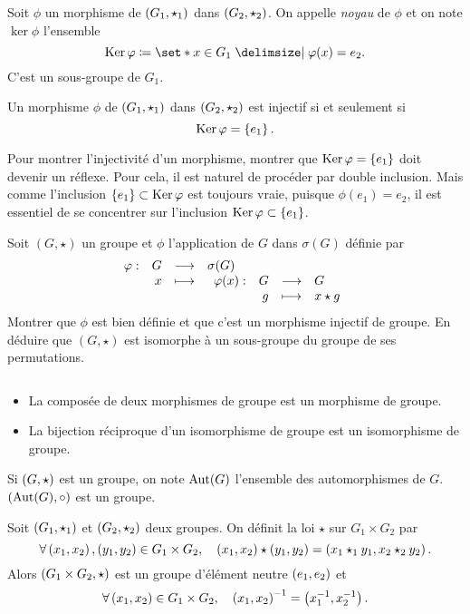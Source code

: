 \documentclass{magnolia}
\begin{document}
\begin{definition}
Soit $\phi$ un morphisme de $\left(G_1,\star_1\right)$ dans $\left(G_2,\star_2\right)$. On
appelle \emph{noyau} de $\phi$ et on note $\ker\phi$ l'ensemble
\[\ker\phi\defeq\enstq{x\in G_1}{\phi(x)=e_2}.\]
C'est un sous-groupe de $G_1$.
\end{definition}

\begin{proposition}
Un morphisme $\phi$ de $\left(G_1,\star_1\right)$ dans $\left(G_2,\star_2\right)$ est injectif
si et seulement si
\[\mathop{\rm Ker}\varphi=\left\{e_1\right\}.\]
\end{proposition}

\begin{remarqueUnique}
\remarque Pour montrer l'injectivité d'un morphisme, montrer que $\mathop{\rm Ker}\varphi=\left\{e_1\right\}$ doit
  devenir un réflexe. Pour cela, il est naturel de procéder par double
  inclusion. Mais comme l'inclusion $\left\{e_1\right\}\subset\mathop{\rm Ker}\varphi$
  est toujours vraie, puisque $\phi(e_1)=e_2$, il est essentiel de se concentrer sur
  l'inclusion $\mathop{\rm Ker}\varphi\subset\left\{e_1\right\}$.
\end{remarqueUnique}


\begin{exoUnique}
\exo Soit $(G,\star)$ un groupe et $\phi$ l'application de $G$ dans
  $\sigma(G)$ définie par
  \[\begin{array}[t]{lrcl} \displaystyle{\varphi} : & \displaystyle{G} & \longrightarrow & \displaystyle{\sigma(G)} \\ & \displaystyle{x} & \longmapsto & \displaystyle{\begin{array}[t]{lrcl} \displaystyle{\varphi(x)} : & \displaystyle{G} & \longrightarrow & \displaystyle{G} \\ & \displaystyle{g} & \longmapsto & \displaystyle{x\star g} \end{array}} \end{array}\]
  Montrer que $\phi$ est bien définie et que c'est un morphisme injectif de
  groupe. En déduire que $(G,\star)$ est isomorphe à un sous-groupe du groupe
  de ses permutations.
\end{exoUnique}

\begin{proposition}
$\quad$
\begin{itemize}
\item La composée de deux morphismes de groupe est un morphisme de groupe.
\item La bijection réciproque d'un isomorphisme de groupe est un isomorphisme de
  groupe.
\end{itemize}
\end{proposition}

\begin{proposition}
Si $\left(G,\star\right)$ est un groupe, on note ${\rm Aut}(G)$ l'ensemble des
automorphismes de $G$. $\left({\rm Aut}(G),\circ\right)$ est un groupe.
\end{proposition}

\begin{definition}
Soit $\left(G_1,\star_1\right)$ et $\left(G_2,\star_2\right)$ deux groupes. On définit la loi $\star$
sur $G_1\times G_2$ par
\[\forall \left(x_1,x_2\right),\left(y_1,y_2\right)\in G_1\times G_2 ,\quad
  \left(x_1,x_2\right)\star\left(y_1,y_2\right)=\left(x_1\star_1 y_1,x_2\star_2 y_2\right).\]
Alors $\left(G_1\times G_2,\star\right)$ est un groupe d'élément neutre $\left(e_1,e_2\right)$ et
\[\forall \left(x_1,x_2\right)\in G_1\times G_2 ,\quad
  \left(x_1,x_2\right)^{-1}=\left(x_1^{-1},x_2^{-1}\right).\]
\end{definition}
\end{document}
